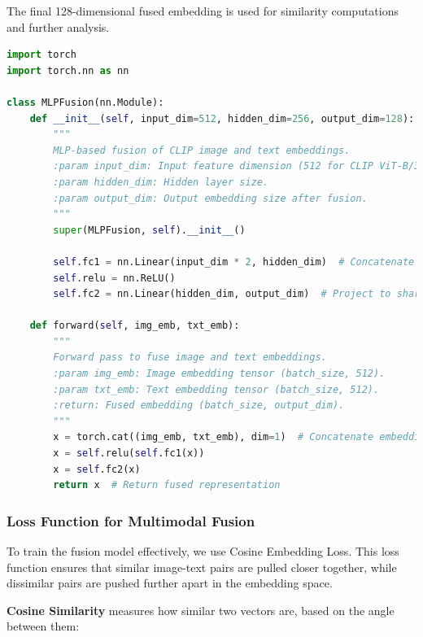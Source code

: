 \documentclass[nolibertine, english, algorithm, nomencl, minted]{ttlab-qualify}
\begin{document}
The final 128-dimensional fused embedding is used for similarity computations and further analysis.

\begin{footnotesize}
\begin{center}
\begin{tcolorbox}[colback=gray!10, colframe=black, arc=5mm]
\begin{lstlisting}[language=Python, breaklines=true]
import torch
import torch.nn as nn

class MLPFusion(nn.Module):
    def __init__(self, input_dim=512, hidden_dim=256, output_dim=128):
        """
        MLP-based fusion of CLIP image and text embeddings.
        :param input_dim: Input feature dimension (512 for CLIP ViT-B/32).
        :param hidden_dim: Hidden layer size.
        :param output_dim: Output embedding size after fusion.
        """
        super(MLPFusion, self).__init__()

        self.fc1 = nn.Linear(input_dim * 2, hidden_dim)  # Concatenate img + text embeddings
        self.relu = nn.ReLU()
        self.fc2 = nn.Linear(hidden_dim, output_dim)  # Project to shared space

    def forward(self, img_emb, txt_emb):
        """
        Forward pass to fuse image and text embeddings.
        :param img_emb: Image embedding tensor (batch_size, 512).
        :param txt_emb: Text embedding tensor (batch_size, 512).
        :return: Fused embedding (batch_size, output_dim).
        """
        x = torch.cat((img_emb, txt_emb), dim=1)  # Concatenate embeddings
        x = self.relu(self.fc1(x))
        x = self.fc2(x)
        return x  # Return fused representation
\end{lstlisting}
\end{tcolorbox}
\end{center}
\end{footnotesize}

\subsubsection{Loss Function for Multimodal Fusion}

To train the fusion model effectively, we use Cosine Embedding Loss. 
This loss function ensures that similar image-text pairs are pulled closer together, while dissimilar pairs 
are pushed further apart in the embedding space.

\textbf{Cosine Similarity} measures how similar two vectors are, based on the angle between them:
\end{document}
